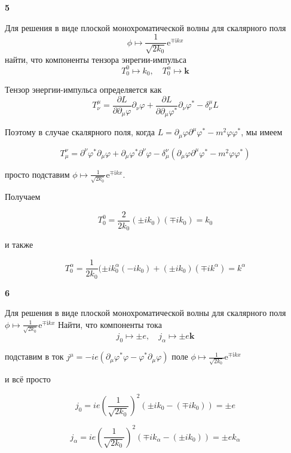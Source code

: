 \documentclass[a4paper,12pt]{article} %
\newcommand{\parder}[2]{\frac{\partial {#1}}{\partial {#2}}} %
\begin{document}
\begin{ttask}\textbf{5}

Для решения в виде плоской монохроматической волны для скалярного поля
$$
\phi \mapsto \frac{1}{\sqrt{2 k_{0}}} \mathrm{e}^{\mp \mathrm{i} k x}
$$
найти, что компоненты тензора энрегии-импульса
$$
T_{0}^{0} \mapsto k_{0}, \quad T_{0}^{\alpha} \mapsto \boldsymbol{k}
$$

Тензор энергии-импульса определяется как 
\[ T^\mu_\nu=\parder{L}{\partial_\mu \varphi}\partial_\nu \varphi+
\parder{L}{\partial_\mu \varphi^{*}}\partial_\nu \varphi^{*}-\delta_\nu^\mu L \]

Поэтому в случае скалярного поля, когда $ L=\partial_\mu \varphi \partial^\mu \varphi^{*}-m^2\varphi \varphi^{*}$, мы имеем


\[ T_\mu^\nu =
\partial^\nu \varphi^{*} \partial_\mu \varphi
+
\partial_\mu \varphi^{*} \partial^\nu \varphi
-
\delta_\mu^\nu 
(\partial_\mu \varphi \partial^\mu \varphi^{*}-m^2\varphi \varphi^{*})
 \]

просто подставим $ \phi \mapsto \frac{1}{\sqrt{2 k_{0}}} \mathrm{e}^{\mp \mathrm{i} k x}$.

Получаем

\[ T^0_0 =
\frac{2}{2k_0}(\pm i k_0)(\mp i k_0)= k_0 \]


и также 


\[ T^\alpha_0 =
\frac{1}{2k_0}
(\pm i k_0^\alpha(-ik_0)+(\pm i k_0)(\mp i k^\alpha)= k^\alpha \]

















\end{ttask}



\begin{ttask}\textbf{6}

Для решения в виде плоской монохроматической волны для скалярного поля
$\phi \mapsto \frac{1}{\sqrt{2 k_{0}}} \mathrm{e}^{\mp \mathrm{i} k x}$
Найти, что компоненты тока
$$
j_{0} \mapsto \pm e, \quad j_{\alpha} \mapsto \pm e \boldsymbol{k}
$$


подставим в ток 
$j^\mu =-i e (\partial_\mu \varphi^{*}\varphi -\varphi^{*}\partial_\mu \varphi)$
поле
$\phi \mapsto \frac{1}{\sqrt{2 k_{0}}} \mathrm{e}^{\mp \mathrm{i} k x}$

и всё просто

\[ j_0 = ie \left(\frac{1}{\sqrt{2k_0}}\right)^2 (\pm i k_0 -(\mp i k_0))= \pm e \]


\[ j_\alpha 
= 
ie \left(\frac{1}{\sqrt{2k_0}}\right)^2 (\mp i k_\alpha -(\pm i k_0))
= 
\pm e k_\alpha \]








\end{ttask}
\end{document}
